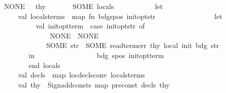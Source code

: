 \begin{isabellebody}
\ \ \ \ \ \ \ \ NONE\ {\isacharequal}{\kern0pt}{\isachargreater}{\kern0pt}\ {\isacharparenleft}{\kern0pt}{\isacharbrackleft}{\kern0pt}{\isacharbrackright}{\kern0pt}{\isacharcomma}{\kern0pt}\ thy{}{\isacharparenright}{\kern0pt}\isanewline
\ \ \ \ \ \ {\isacharbar}{\kern0pt}\ SOME\ locals\ {\isacharequal}{\kern0pt}{\isachargreater}{\kern0pt}\isanewline
\ \ \ \ \ \ \ \ \ \ let\isanewline
\ \ \ \ \ \ \ \ \ \ \ \ val\ locals{\isacharunderscore}{\kern0pt}terms\ {\isacharequal}{\kern0pt}\ map\ {\isacharparenleft}{\kern0pt}fn\ {\isacharparenleft}{\kern0pt}{\isacharparenleft}{\kern0pt}bdg{\isacharcomma}{\kern0pt}{\isacharparenleft}{\kern0pt}s{\isacharcomma}{\kern0pt}pos{\isacharparenright}{\kern0pt}{\isacharparenright}{\kern0pt}{\isacharcomma}{\kern0pt}\ init{\isacharunderscore}{\kern0pt}opt{\isacharunderscore}{\kern0pt}str{\isacharparenright}{\kern0pt}\ {\isacharequal}{\kern0pt}{\isachargreater}{\kern0pt}\isanewline
\ \ \ \ \ \ \ \ \ \ \ \ \ \ \ let\isanewline
\ \ \ \ \ \ \ \ \ \ \ \ \ \ \ \ \ val\ init{\isacharunderscore}{\kern0pt}opt{\isacharunderscore}{\kern0pt}term\ {\isacharequal}{\kern0pt}\ case\ init{\isacharunderscore}{\kern0pt}opt{\isacharunderscore}{\kern0pt}str\ of\isanewline
\ \ \ \ \ \ \ \ \ \ \ \ \ \ \ \ \ \ \ \ \ NONE\ {\isacharequal}{\kern0pt}{\isachargreater}{\kern0pt}\ NONE\isanewline
\ \ \ \ \ \ \ \ \ \ \ \ \ \ \ \ \ \ \ {\isacharbar}{\kern0pt}\ SOME\ str\ {\isacharequal}{\kern0pt}{\isachargreater}{\kern0pt}\ SOME\ {\isacharparenleft}{\kern0pt}read{\isacharunderscore}{\kern0pt}term{\isacharunderscore}{\kern0pt}err\ thy\ {\isachardoublequote}{\kern0pt}local\ init{\isachardoublequote}{\kern0pt}\ bdg\ str{\isacharparenright}{\kern0pt}\isanewline
\ \ \ \ \ \ \ \ \ \ \ \ \ \ \ in\isanewline
\ \ \ \ \ \ \ \ \ \ \ \ \ \ \ \ \ {\isacharparenleft}{\kern0pt}{\isacharparenleft}{\kern0pt}bdg{\isacharcomma}{\kern0pt}\ {\isacharparenleft}{\kern0pt}s{\isacharcomma}{\kern0pt}pos{\isacharparenright}{\kern0pt}{\isacharparenright}{\kern0pt}{\isacharcomma}{\kern0pt}\ init{\isacharunderscore}{\kern0pt}opt{\isacharunderscore}{\kern0pt}term{\isacharparenright}{\kern0pt}\isanewline
\ \ \ \ \ \ \ \ \ \ \ \ \ \ \ end{\isacharparenright}{\kern0pt}\ locals\isanewline
\ \ \ \ \isanewline
\ \ \ \ \ \ \ \ \ \ \ \ val\ decls\ {\isacharequal}{\kern0pt}\ map\ loc{\isacharunderscore}{\kern0pt}decls{\isacharunderscore}{\kern0pt}conv\ locals{\isacharunderscore}{\kern0pt}terms\isanewline
\ \ \ \ \ \ \ \ \ \ \ \ val\ thy{}\ {\isacharequal}{\kern0pt}\ Sign{\isachardot}{\kern0pt}add{\isacharunderscore}{\kern0pt}consts\ {\isacharparenleft}{\kern0pt}map\ pre{\isacharunderscore}{\kern0pt}const\ decls{\isacharparenright}{\kern0pt}\ thy{}\isanewline

\end{isabellebody}
